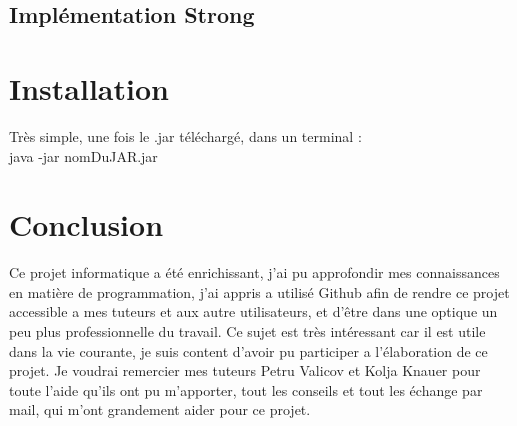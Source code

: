 \documentclass[11pt]{article}
\begin{document}
\subsection{Implémentation Strong}



\section{Installation}

Très simple, une fois le .jar téléchargé, dans un terminal :\\
java -jar nomDuJAR.jar

\section{Conclusion}\label{conclusions}
Ce projet informatique a été enrichissant, j'ai pu approfondir mes connaissances en matière de programmation, j'ai appris a utilisé Github afin de rendre ce projet accessible a mes tuteurs et aux autre utilisateurs, et d’être dans une optique un peu plus professionnelle du travail. Ce sujet est très intéressant car il est utile dans la vie courante, je suis content d'avoir pu participer a l'élaboration de ce projet. Je voudrai remercier mes tuteurs Petru Valicov et Kolja Knauer pour toute l'aide qu'ils ont pu m'apporter, tout les conseils et tout les échange par mail, qui m'ont grandement aider pour ce projet.



\end{document}
